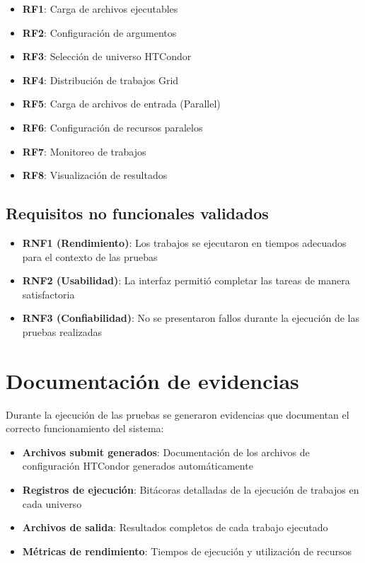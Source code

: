 \begin{itemize}
	\item \textbf{RF1}: Carga de archivos ejecutables
	\item \textbf{RF2}: Configuración de argumentos
	\item \textbf{RF3}: Selección de universo HTCondor
	\item \textbf{RF4}: Distribución de trabajos Grid
	\item \textbf{RF5}: Carga de archivos de entrada (Parallel)
	\item \textbf{RF6}: Configuración de recursos paralelos
	\item \textbf{RF7}: Monitoreo de trabajos
	\item \textbf{RF8}: Visualización de resultados
\end{itemize}

\subsection{Requisitos no funcionales validados}
\noindent

\begin{itemize}
	\item \textbf{RNF1 (Rendimiento)}: Los trabajos se ejecutaron en tiempos adecuados para el contexto de las pruebas
	\item \textbf{RNF2 (Usabilidad)}: La interfaz permitió completar las tareas de manera satisfactoria
	\item \textbf{RNF3 (Confiabilidad)}: No se presentaron fallos durante la ejecución de las pruebas realizadas
\end{itemize}

\section{Documentación de evidencias}
\noindent

Durante la ejecución de las pruebas se generaron evidencias que documentan el correcto funcionamiento del sistema:

\begin{itemize}
	\item \textbf{Archivos submit generados}: Documentación de los archivos de configuración HTCondor generados automáticamente
	\item \textbf{Registros de ejecución}: Bitácoras detalladas de la ejecución de trabajos en cada universo
	\item \textbf{Archivos de salida}: Resultados completos de cada trabajo ejecutado
	\item \textbf{Métricas de rendimiento}: Tiempos de ejecución y utilización de recursos
\end{itemize}

